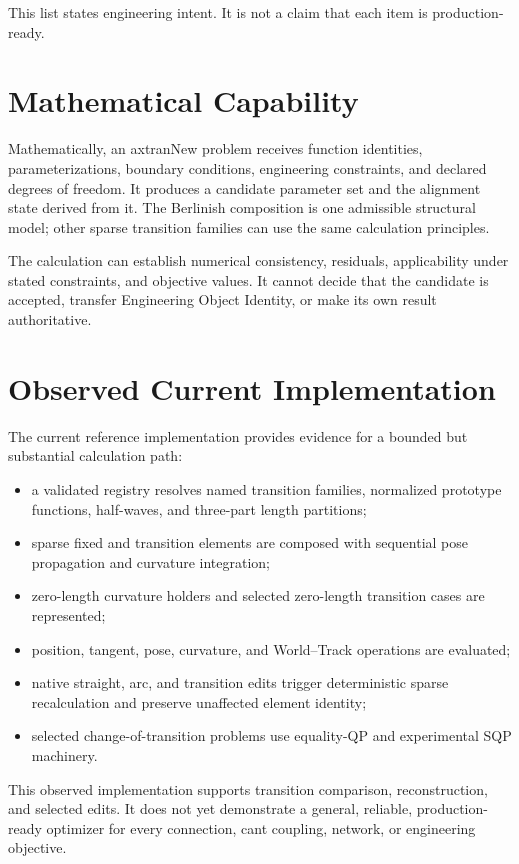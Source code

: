 This list states engineering intent. It is not a claim that each item is
production-ready.

\section{Mathematical Capability}

Mathematically, an axtranNew problem receives function identities,
parameterizations, boundary conditions, engineering constraints, and declared
degrees of freedom. It produces a candidate parameter set and the alignment
state derived from it. The Berlinish composition is one admissible structural
model; other sparse transition families can use the same calculation
principles.

The calculation can establish numerical consistency, residuals,
applicability under stated constraints, and objective values. It cannot decide
that the candidate is accepted, transfer Engineering Object Identity, or make
its own result authoritative.

\section{Observed Current Implementation}

The current reference implementation provides evidence for a bounded but
substantial calculation path:
\begin{itemize}
\item a validated registry resolves named transition families, normalized
prototype functions, half-waves, and three-part length partitions;
\item sparse fixed and transition elements are composed with sequential pose
propagation and curvature integration;
\item zero-length curvature holders and selected zero-length transition cases
are represented;
\item position, tangent, pose, curvature, and World--Track operations are
evaluated;
\item native straight, arc, and transition edits trigger deterministic sparse
recalculation and preserve unaffected element identity;
\item selected change-of-transition problems use equality-QP and experimental
SQP machinery.
\end{itemize}

This observed implementation supports transition comparison, reconstruction,
and selected edits. It does not yet demonstrate a general, reliable,
production-ready optimizer for every connection, cant coupling, network, or
engineering objective.

